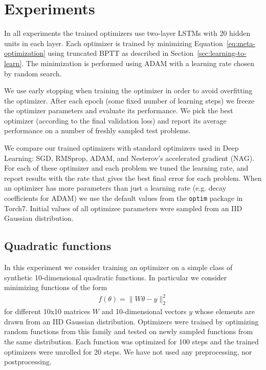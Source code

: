 \section{Experiments}\label{sec:exp}

In all experiments the trained optimizers use two-layer LSTMs with 20 hidden
units in each layer. Each optimizer is trained by minimizing
Equation~\ref{eq:meta-optimization} using truncated BPTT as described in
Section~\ref{sec:learning-to-learn}. The minimization is performed using ADAM
with a learning rate chosen by random search.

We use early stopping when training the optimizer in order to avoid overfitting
the optimizer.  After each epoch (some fixed number of learning steps) we
freeze the optimizer parameters and evaluate its performance.  We pick the best
optimizer (according to the final validation loss) and report its average
performance on a number of freshly sampled test problems.

We compare our trained optimizers with standard optimizers used in Deep
Learning: SGD, RMSprop, ADAM, and Nesterov's accelerated gradient (NAG).
For each of these optimizer and each problem we tuned the learning rate, and
report results with the rate that gives the best final error for each problem.
When an optimizer has more parameters than just a learning rate (e.g. decay
coefficients for ADAM) we use the default values from the \texttt{optim}
package in Torch7.  Initial values of all optimizee parameters were sampled
from an IID Gaussian distribution.



\subsection{Quadratic functions}

In this experiment we consider training an optimizer on a simple class of
synthetic 10-dimensional quadratic functions.  In particular we consider minimizing
functions of the form
\begin{align*}
    f(\theta) = \|W\theta - y\|_2^2
\end{align*}
for different 10x10 matrices $W$ and 10-dimensional vectors $y$ whose elements are drawn
from an IID Gaussian distribution.
Optimizers were trained by optimizing random functions from this family and
tested on newly sampled functions from the same distribution.  Each function was
optimized for 100 steps and the trained optimizers were unrolled for 20 steps.
We have not used any preprocessing, nor postprocessing.

